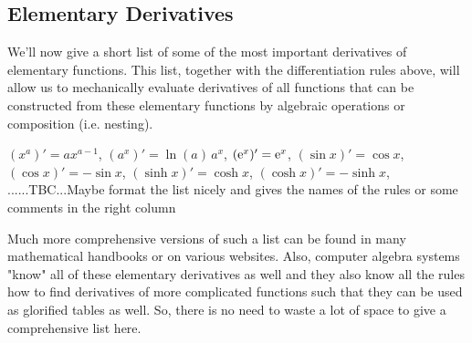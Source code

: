 

\subsection{Elementary Derivatives}
We'll now give a short list of some of the most important derivatives of elementary functions. This list, together with the differentiation rules above, will allow us to mechanically evaluate derivatives of all functions that can be constructed from these elementary functions by algebraic operations or composition (i.e. nesting). 

\medskip
$(x^a)' = a x^{a-1}$, $(a^x)' = \ln(a) \, a^x$, $(\operatorname{\mathrm{e}}^x)' = \operatorname{\mathrm{e}}^x$, $(\sin x)' = \cos x$, $(\cos x)' = -\sin x$, $(\sinh x)' = \cosh x$, $(\cosh x)' = -\sinh x$, ......TBC...Maybe format the list nicely and gives the names of the rules or some comments in the right column


\medskip
Much more comprehensive versions of such a list can be found in many mathematical handbooks or on various websites. Also, computer algebra systems "know" all of these elementary derivatives as well and they also know all the rules how to find derivatives of more complicated functions such that they can be used as glorified tables as well. So, there is no need to waste a lot of space to give a comprehensive list here.






